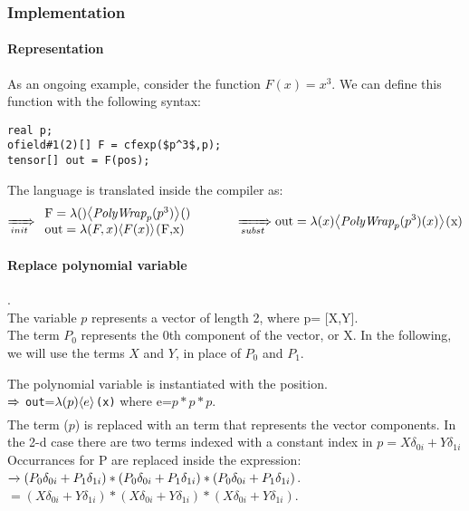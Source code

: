  

\subsubsection{Implementation}
\paragraph{Representation}
As an ongoing example, consider the function $F(x) = x^3$.
We can define this function with the following syntax:\begin{lstlisting}[mathescape=true]
real p; 
ofield#1(2)[] F = cfexp($p^3$,p);
tensor[] out = F(pos);
\end{lstlisting}
The language is translated inside the compiler as:
\begin{displaymath}
\rewriteInitA \begin{array}{ll} \lstinline[mathescape=true]!F!=\lambda ()\EinExp{\expPolyWrap{p}{{p}^3}}{}() \\
\lstinline[mathescape=true]!out!=\lambda(F,x) \EinExp{F(x)}{}\lstinline[mathescape=true]!(F,x)!\end{array}
\indent \indent
\rewriteSubst{} \lstinline[mathescape=true]!out!=\lambda(x) \EinExp{\expPolyWrap{p}{p^3}(x)}{}
\lstinline[mathescape=true]!(x)!
\end{displaymath}

\paragraph{Replace polynomial variable}.\\
The variable $p$ represents a vector of length 2, where p= [X,Y].\\
The term $P_0$ represents the 0th component of the vector, or X.
In the following, we will use the terms $X$ and $Y$, in place of $P_0$ and $P_1$.


The polynomial variable is instantiated with the position.\\
$\xRightarrow[]{} $ \lstinline[mathescape=true]!out!=$\lambda(p) {\left\langle{e}\right\rangle}_{}$\lstinline[mathescape=true]!(x)! where e=$p*p*p$.\\
The \name{} term ($p$) is replaced with an \name{} term that represents the vector components.
 In the 2-d case there are two terms indexed with a constant index in 
$p = X \delta_{0i}+Y \delta_{1i}$\\


Occurrances for P are replaced inside the expression:\\ 
$\xrightarrow[]{} (P_0 \delta_{0i}+P_1 \delta_{1i})*(P_0 \delta_{0i}+P_1 \delta_{1i})*(P_0 \delta_{0i}+P_1 \delta_{1i})$.\\
$= (X \delta_{0i}+Y \delta_{1i})*(X \delta_{0i}+Y \delta_{1i})*(X \delta_{0i}+Y\delta_{1i})$.\\





